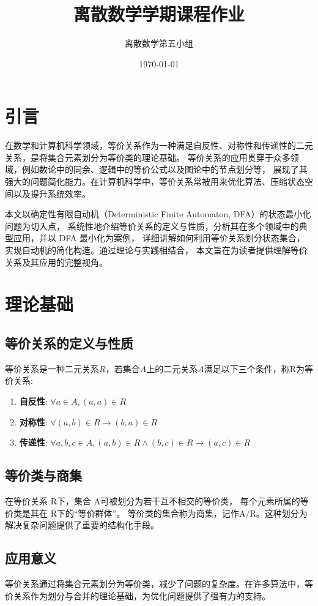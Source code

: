 \documentclass{article}
\title{离散数学学期课程作业}
\author{离散数学第五小组}
\date{\today}
\begin{document}
\maketitle

\section{引言}


    在数学和计算机科学领域，等价关系作为一种满足自反性、对称性和传递性的二元关系，是将集合元素划分为等价类的理论基础。
等价关系的应用贯穿于众多领域，例如数论中的同余、逻辑中的等价公式以及图论中的节点划分等，
展现了其强大的问题简化能力。在计算机科学中，等价关系常被用来优化算法、压缩状态空间以及提升系统效率。

    本文以确定性有限自动机（Deterministic Finite Automaton, DFA）的状态最小化问题为切入点，
系统性地介绍等价关系的定义与性质，分析其在多个领域中的典型应用，并以 DFA 最小化为案例，
详细讲解如何利用等价关系划分状态集合，实现自动机的简化构造。通过理论与实践相结合，
本文旨在为读者提供理解等价关系及其应用的完整视角。

\section{理论基础}
\subsection{等价关系的定义与性质}
    等价关系是一种二元关系$R$，若集合$A$上的二元关系$A$满足以下三个条件，称$\mathrm{R}$为等价关系:
\begin{enumerate}
    \item \textbf{自反性}: $\forall a \in A, (a,a) \in R$
    \item \textbf{对称性}: $\forall (a,b)\in R \rightarrow (b,a) \in R $
    \item \textbf{传递性}: $\forall a,b,c \in A, (a,b) \in R \wedge (b,c) \in R \rightarrow (a,c) \in R$
\end{enumerate}
\subsection{等价类与商集}
在等价关系 $\mathrm{R}$下，集合 $\mathrm{A}$可被划分为若干互不相交的等价类，
每个元素所属的等价类是其在 $\mathrm{R}$下的“等价群体”。
等价类的集合称为商集，记作$\mathrm{A}/\mathrm{R}$。这种划分为解决复杂问题提供了重要的结构化手段。

\subsection{应用意义}
等价关系通过将集合元素划分为等价类，减少了问题的复杂度。在许多算法中，等价关系作为划分与合并的理论基础，为优化问题提供了强有力的支持。
\end{document}
